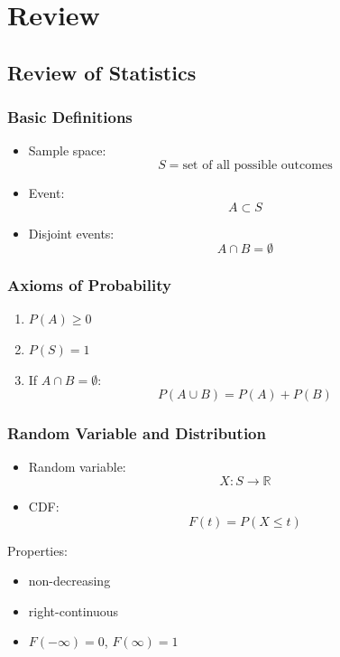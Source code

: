 \chapter{Review}

\section{Review of Statistics}

\subsection{Basic Definitions}

\begin{itemize}
    \item Sample space:
    \[
    S = \text{set of all possible outcomes}
    \]

    \item Event:
    \[
    A \subset S
    \]

    \item Disjoint events:
    \[
    A \cap B = \emptyset
    \]
\end{itemize}

\subsection{Axioms of Probability}

\begin{enumerate}
    \item $P(A) \geq 0$
    \item $P(S) = 1$
    \item If $A \cap B = \emptyset$:
    \[
    P(A \cup B) = P(A) + P(B)
    \]
\end{enumerate}

\subsection{Random Variable and Distribution}

\begin{itemize}
    \item Random variable:
    \[
    X: S \to \mathbb{R}
    \]

    \item CDF:
    \[
    F(t) = P(X \leq t)
    \]
\end{itemize}

Properties:
\begin{itemize}
    \item non-decreasing
    \item right-continuous
    \item $F(-\infty)=0$, $F(\infty)=1$
\end{itemize}

